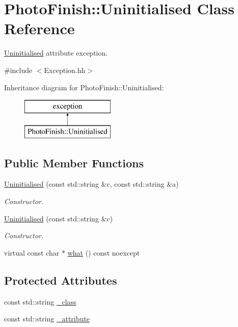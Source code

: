 \hypertarget{class_photo_finish_1_1_uninitialised}{}\section{Photo\+Finish\+:\+:Uninitialised Class Reference}
\label{class_photo_finish_1_1_uninitialised}


\hyperlink{class_photo_finish_1_1_uninitialised}{Uninitialised} attribute exception.  




{\ttfamily \#include $<$Exception.\+hh$>$}

Inheritance diagram for Photo\+Finish\+:\+:Uninitialised\+:\begin{figure}[H]
\begin{center}
\leavevmode
\includegraphics[height=2.000000cm]{class_photo_finish_1_1_uninitialised}
\end{center}
\end{figure}
\subsection*{Public Member Functions}
\begin{DoxyCompactItemize}
\item 
\hyperlink{class_photo_finish_1_1_uninitialised_a83de97d09eee169849b36c340d97f57b}{Uninitialised} (const std\+::string \&c, const std\+::string \&a)
\begin{DoxyCompactList}\small\item\em Constructor. \end{DoxyCompactList}\item 
\hyperlink{class_photo_finish_1_1_uninitialised_a5c1fe051480928e211eb166f3e689d4f}{Uninitialised} (const std\+::string \&c)
\begin{DoxyCompactList}\small\item\em Constructor. \end{DoxyCompactList}\item 
virtual const char $\ast$ \hyperlink{class_photo_finish_1_1_uninitialised_abcacbb95c781de444008436d0c4363d3}{what} () const noexcept
\end{DoxyCompactItemize}
\subsection*{Protected Attributes}
\begin{DoxyCompactItemize}
\item 
const std\+::string \hyperlink{class_photo_finish_1_1_uninitialised_aa01e789c88f361ad1131588d25f8dbd2}{\+\_\+class}
\item 
const std\+::string \hyperlink{class_photo_finish_1_1_uninitialised_a8bee04882d0723690447148fb05b439a}{\+\_\+attribute}
\end{DoxyCompactItemize}



